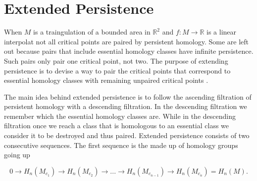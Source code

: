 \section{Extended Persistence}



%
%

%




When $M$ is a traingulation of a bounded area in $\mathbb{R}^2$ and $f: M \to \mathbb{R}$ is a linear interpolat not all critical points are paired by persistent homology. Some are left out because pairs that include essential homology classes have infinite persistence. Such pairs only pair one critical point, not two. The purpose of extending persistence is to devise a way to pair the critical points that correspond to essential homology classes with remaining unpaired critical points \cite{persistence-extended}.

The main idea behind extended persistence is to follow the ascending filtration of persistent homology with a descending filtration. In the descending filtration we remember which the essential homology classes are. While in the descending filtration once we reach a class that is homologous to an essential class we consider it to be destroyed and thus paired. Extended persistence consists of two consecutive sequences. The first sequence is the made up of homology groups going up

$$ 0 \rightarrow H_n(M_{c_1}) \rightarrow H_n(M_{c_2}) \rightarrow ... \rightarrow H_n(M_{c_{n-1}}) \rightarrow H_n(M_{c_n}) =  H_n(M) .$$

